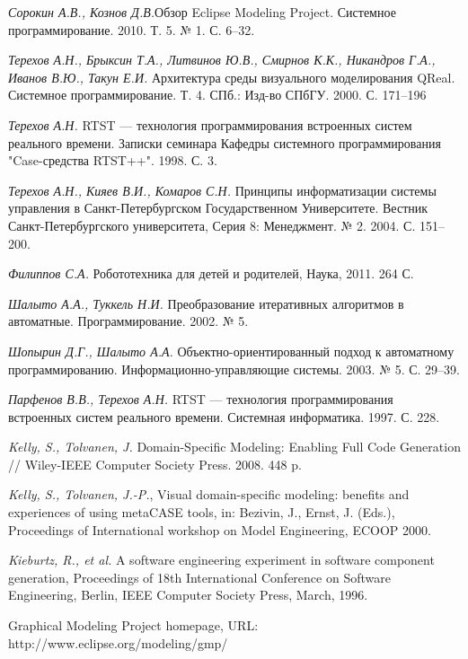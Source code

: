 \documentclass[a4paper]{article}
\begin{document}
{\begin{thebibliography}{9001}
 \emph{Сорокин А.В., Кознов Д.В.}Обзор Eclipse Modeling Project. Системное программирование. 2010. Т. 5. № 1. С. 6--32. 

   \emph{Терехов А.Н., Брыксин Т.А., Литвинов Ю.В., Смирнов К.К., Никандров Г.А., Иванов В.Ю., Такун Е.И.} Архитектура среды визуального моделирования QReal. Системное программирование. Т. 4.  СПб.: Изд-во СПбГУ. 2000. С. 171--196

   \emph{Терехов А.Н.} RTST --- технология программирования встроенных систем реального времени. Записки семинара Кафедры системного программирования "Case-средства RTST++". 1998. С. 3.

   \emph{Терехов А.Н., Кияев В.И., Комаров С.Н.} Принципы информатизации системы управления в Санкт-Петербургском Государственном Университете. Вестник Санкт-Петербургского университета, Серия 8: Менеджмент. № 2. 2004. С. 151--200.

   \emph{Филиппов С.А.} Робототехника для детей и родителей, Наука, 2011. 264 С.

  \bibitem  \emph {Шалыто А.А., Туккель Н.И.} Преобразование итеративных алгоритмов в автоматные. Программирование. 2002. № 5.

\bibitem  \emph {Шопырин Д.Г., Шалыто А.А.} Объектно-ориентированный подход к автоматному программированию. Информационно-управляющие системы. 2003. № 5. С. 29--39.


   \emph{Парфенов В.В., Терехов А.Н.} RTST --- технология программирования встроенных систем реального времени. Системная информатика. 1997. С. 228.

   \emph{Kelly, S., Tolvanen, J.} Domain-Specific Modeling: Enabling Full Code Generation // Wiley-IEEE Computer Society Press. 2008. 448 p.

   \emph{Kelly, S., Tolvanen, J.-P.}, Visual domain-specific modeling: benefits and experiences of using metaCASE tools, in: Bezivin, J., Ernst, J. (Eds.), Proceedings of International workshop on Model Engineering, ECOOP 2000.

   \emph{Kieburtz, R., et al.} A software engineering experiment in software component generation, Proceedings of 18th International Conference on Software Engineering, Berlin, IEEE Computer Society Press, March, 1996.

   Graphical Modeling Project homepage, URL: http://www.eclipse.org/modeling/gmp/ 


\end{thebibliography}}
\end{document}
